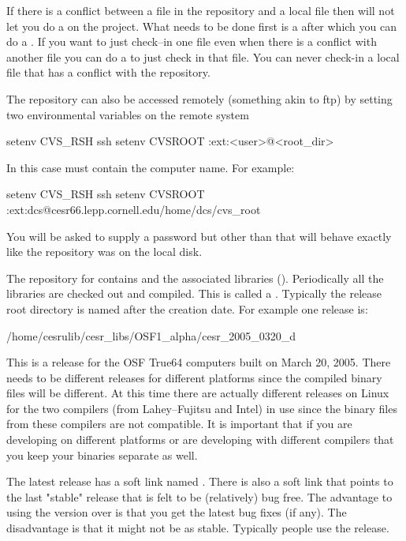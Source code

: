 If there is a conflict between a file in the repository and a local
file then \cvs will not let you do a  on the project. What
needs to be done first is a  after which you can do a
. If you want to just check--in one file even when there is
a conflict with another file you can do a  to just
check in that file. You can never check-in a local file that has a
conflict with the repository.

The repository can also be accessed remotely (something akin to ftp)
by setting two environmental variables on the remote system
\begin{example}
  setenv CVS_RSH ssh
  setenv CVSROOT :ext:<user>@<root_dir>
\end{example}
In this case  must contain the computer name. For example:
\begin{example}
  setenv CVS_RSH ssh
  setenv CVSROOT :ext:dcs@cesr66.lepp.cornell.edu/home/dcs/cvs_root
\end{example}
You will be asked to supply a password but other than that will
behave exactly like the repository was on the local disk.



The \cvs repository for \bmad contains \bmad and the associated
libraries (). Periodically all the libraries are checked
out and compiled. This is called a . Typically the release
root directory is named after the creation date. For example one release is:
\begin{example}
  /home/cesrulib/cesr_libs/OSF1_alpha/cesr_2005_0320_d
\end{example}
This is a release for the OSF True64 computers built on March 20,
2005. There needs to be different releases for different platforms
since the compiled binary files will be different. At this time there
are actually different releases on Linux for the two compilers (from
Lahey--Fujitsu and Intel) in use since the binary files from these
compilers are not compatible. It is important that if you are
developing on different platforms or are developing with different
compilers that you keep your binaries separate as well.

The latest release has a soft link named . There is
also a  soft link that
points to the last "stable" release that is felt to be (relatively)
bug free. The advantage to using the  version over
 is that you get the latest bug fixes (if any). The
disadvantage is that it might not be as stable. Typically people use
the  release.

